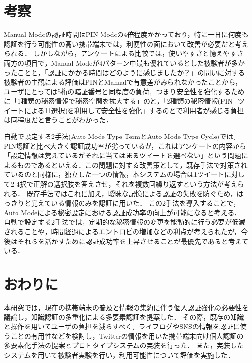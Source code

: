 \documentclass[twocolumn, a4paper, 9pt]{UECIEresume}
\begin{document}
\section{考察}\label{discussion}
Manual Modeの認証時間はPIN Modeの4倍程度かかっており，特に一日に何度も認証を行う可能性の高い携帯端末では，利便性の面において改善が必要だと考えられる．
しかしながら，アンケートによる比較では，使いやすさと憶えやすさ両方の項目で，Manual Modeが4パターン中最も優れているとした被験者が多かったことと，「認証にかかる時間はどのように感じましたか？」の問いに対する被験者の主観による評価はPINとManualで有意差がみられなかったことから，ユーザにとっては5桁の暗証番号と同程度の負荷，つまり安全性を強化するために「1種類の秘密情報で秘密空間を拡大する」のと，「2種類の秘密情報(PIN+ツイートによる11選択)を利用して安全性を強化」するのとで利用者が感じる負担は同程度だと言うことがわかった．

自動で設定する2手法(Auto Mode Type TermとAuto Mode Type Cycle)では，PIN認証と比べ大きく認証成功率が劣っているが，これはアンケートの内容から「設定情報は覚えているがそれに当てはまるツイートを選べない」という問題によるものであるといえる．この問題に対する改善策として，既存手法\cite{西垣正勝:2006-03-15}で対策されているのと同様に，独立した一つの情報，本システムの場合は1ツイートに対して2-4択で正解の選択肢を答えさせ，それを複数回繰り返すという方法が考えられる．
既存手法ではこれに加え，曖昧な記憶による認証の失敗を防ぐため，はっきりと覚えている情報のみを認証に用いた．
この2手法を導入することで，Auto Modeによる秘密設定における認証成功率の向上が可能になると考える．
自動で設定する2手法では，定期的な秘密情報の変更を能動的に行う必要が低減されることや，時間経過によるエントロピの増加などの利点が考えられたが，今後はそれらを活かすために認証成功率を上昇させることが最優先であると考えている．

\section{おわりに}\label{finish}
本研究では，現在の携帯端末の普及と情報の集約に伴う個人認証強化の必要性を議論し，知識認証の多重化による多要素認証を提案した．
その際，既存の知識と操作を用いてユーザの負担を減らすべく，ライフログやSNSの情報を認証に使うことの有用性などを検討し，Twitterの情報を用いた携帯端末向け個人認証の多要素化手法の提案とプロトタイプシステムの実装を行った．
また，実装したシステムを用いて被験者実験を行い，利用可能性について評価を実施した．



\end{document}
